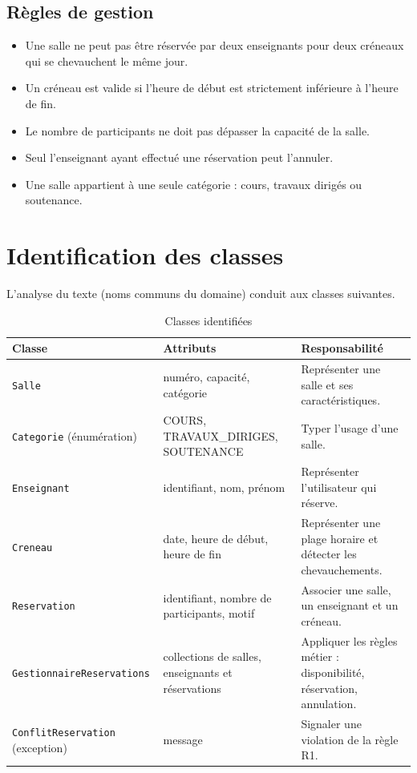 \documentclass[12pt,a4paper]{report}
\begin{document}
\section{Règles de gestion}
\begin{itemize}
  \item[\textbf{R1}] Une salle ne peut pas être réservée par deux enseignants pour deux créneaux qui se chevauchent le même jour.
  \item[\textbf{R2}] Un créneau est valide si l'heure de début est strictement inférieure à l'heure de fin.
  \item[\textbf{R3}] Le nombre de participants ne doit pas dépasser la capacité de la salle.
  \item[\textbf{R4}] Seul l'enseignant ayant effectué une réservation peut l'annuler.
  \item[\textbf{R5}] Une salle appartient à une seule catégorie : cours, travaux dirigés ou soutenance.
\end{itemize}

\chapter{Identification des classes}

L'analyse du texte (noms communs du domaine) conduit aux classes suivantes.

\begin{table}[H]
\centering
\renewcommand{\arraystretch}{1.3}
\begin{tabular}{@{}l p{4.6cm} p{6cm}@{}}
\toprule
\rowcolor{headcol}\textbf{Classe} & \textbf{Attributs} & \textbf{Responsabilité} \\
\midrule
\texttt{Salle} & numéro, capacité, catégorie & Représenter une salle et ses caractéristiques. \\
\texttt{Categorie} (énumération) & COURS, TRAVAUX\_DIRIGES, SOUTENANCE & Typer l'usage d'une salle. \\
\texttt{Enseignant} & identifiant, nom, prénom & Représenter l'utilisateur qui réserve. \\
\texttt{Creneau} & date, heure de début, heure de fin & Représenter une plage horaire et détecter les chevauchements. \\
\texttt{Reservation} & identifiant, nombre de participants, motif & Associer une salle, un enseignant et un créneau. \\
\texttt{GestionnaireReservations} & collections de salles, enseignants et réservations & Appliquer les règles métier : disponibilité, réservation, annulation. \\
\texttt{ConflitReservation} (exception) & message & Signaler une violation de la règle R1. \\
\bottomrule
\end{tabular}
\caption{Classes identifiées}
\end{table}
\end{document}
